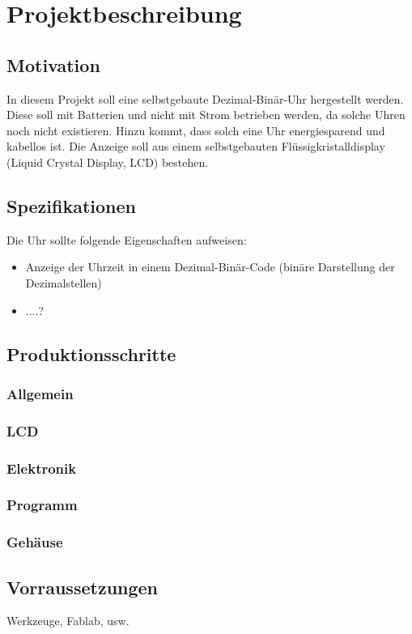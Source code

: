 \section{Projektbeschreibung}
\subsection{Motivation}
In diesem Projekt soll eine selbstgebaute Dezimal-Binär-Uhr hergestellt werden. Diese soll mit Batterien und nicht mit Strom betrieben werden, da solche Uhren noch nicht existieren. Hinzu kommt, dass solch eine Uhr energiesparend und kabellos ist. Die Anzeige soll aus einem selbstgebauten Flüssigkristalldisplay (Liquid Crystal Display, LCD) bestehen. 

\subsection{Spezifikationen}
Die Uhr sollte folgende Eigenschaften aufweisen:
\begin{itemize}
\item Anzeige der Uhrzeit in einem Dezimal-Binär-Code (binäre Darstellung der Dezimalstellen)
\item ....?

\end{itemize}

\subsection{Produktionsschritte}
\subsubsection*{Allgemein}
\subsubsection*{LCD}
\subsubsection*{Elektronik}
\subsubsection*{Programm}
\subsubsection*{Gehäuse}



\subsection{Vorraussetzungen}
Werkzeuge, Fablab, usw.